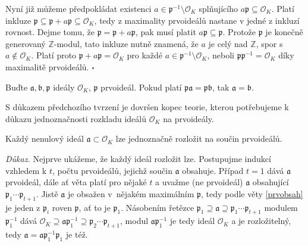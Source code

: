 \documentclass[12pt]{report}
\begin{document}
Nyní již můžeme předpokládat existenci $a \in \mathfrak{p}^{-1} \setminus \mathcal{O}_K$ splňujícího $a \mathfrak{p} \subseteq \mathcal{O}_K$. Platí inkluze $\mathfrak{p} \subseteq \mathfrak{p}+a \mathfrak{p} \subseteq \mathcal{O}_K$, tedy z maximality prvoideálů nastane v jedné z inkluzí rovnost. Dejme tomu, že $\mathfrak{p} = \mathfrak{p} + a \mathfrak{p}$, pak musí platit $a \mathfrak{p} \subseteq \mathfrak{p}$. Protože $\mathfrak{p}$ je konečně generovaný $\mathbb{Z}$-modul, tato inkluze nutně znamená, že $a$ je celý nad $\mathbb{Z}$, spor s $a \not\in \mathcal{O}_K$. Platí proto $\mathfrak{p} + a \mathfrak{p} = \mathcal{O}_K$ pro každé $a \in \mathfrak{p}^{-1} \setminus \mathcal{O}_K$, neboli $\mathfrak{p} \mathfrak{p}^{-1} = \mathcal{O}_K$ díky maximalitě prvoideálů. \hfill $\square$\\

\begin{dusledek}\label{cancel}
Buďte $\mathfrak{a},\mathfrak{b},\mathfrak{p}$ ideály $\mathcal{O}_K$, $\mathfrak{p}$ prvoideál. Pokud platí $\mathfrak{p} \mathfrak{a} = \mathfrak{p} \mathfrak{b}$, tak $\mathfrak{a} = \mathfrak{b}$.
\end{dusledek}

S důkazem předchozího tvrzení je dovršen kopec teorie, kterou potřebujeme k důkazu jednoznačnosti rozkladu ideálů $\mathcal{O}_K$ na prvoideály.

\begin{veta}
Každý nenulový ideál $\mathfrak{a} \subset \mathcal{O}_K$ lze jednoznačně rozložit na součin prvoideálů.
\end{veta}
\noindent \textit{Důkaz.} Nejprve ukážeme, že každý ideál rozložit lze. Postupujme indukcí vzhledem k $t$, počtu prvoideálů, jejichž součin $\mathfrak{a}$ obsahuje. Případ $t=1$ dává $\mathfrak{a}$ prvoideál, dále ať věta platí pro nějaké $t$ a uvažme (ne prvoideál) $\mathfrak{a}$ obsahující $\mathfrak{p}_1 \cdots \mathfrak{p}_{t+1}$. Jistě $\mathfrak{a}$ je obsažen v~nějakém maximálním $\mathfrak{p}$, tedy podle věty \ref{prvobsah} je jeden z $\mathfrak{p}_i$ roven $\mathfrak{p}$, ať to je $\mathfrak{p}_1$. Násobením řetězce $\mathfrak{p}_1 \supseteq \mathfrak{a} \supseteq \mathfrak{p}_1 \cdots \mathfrak{p}_{t+1}$ modulem $\mathfrak{p}_1^{-1}$ dává $\mathcal{O}_K \supseteq \mathfrak{a} \mathfrak{p}_1^{-1} \supseteq \mathfrak{p}_2 \cdots \mathfrak{p}_{t+1}$, modul $\mathfrak{a} \mathfrak{p}_1^{-1}$ je tedy ideál $\mathcal{O}_K$ a je rozložitelný, tedy $\mathfrak{a} = \mathfrak{a} \mathfrak{p}_1^{-1} \mathfrak{p}_1$ je též.
\end{document}
